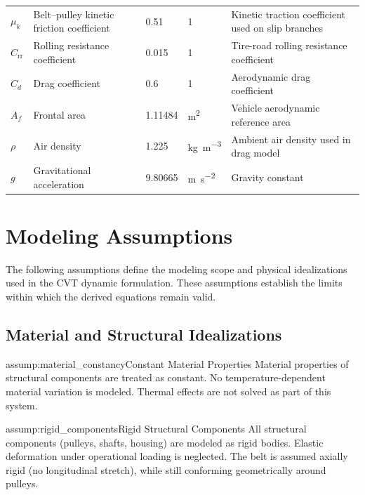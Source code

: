 \documentclass[11pt]{article}
\numberwithin{equation}{section}
\newcounter{assump}
\begin{document}
\begin{center}
\begin{longtable}{@{}p{}p{}p{}p{}p{}@{}}
$\mu_k$ & Belt--pulley kinetic friction coefficient & 0.51 & 1 & Kinetic traction coefficient used on slip branches \\
$C_{\mathrm{rr}}$ & Rolling resistance coefficient & 0.015 & 1 & Tire-road rolling resistance coefficient \\
$C_d$ & Drag coefficient & 0.6 & 1 & Aerodynamic drag coefficient \\
$A_f$ & Frontal area & 1.11484 & \si{\meter\squared} & Vehicle aerodynamic reference area \\
$\rho$ & Air density & 1.225 & \si{\kilogram\per\meter\cubed} & Ambient air density used in drag model \\
$g$ & Gravitational acceleration & 9.80665 & \si{\meter\per\second\squared} & Gravity constant \\
\end{longtable}
\normalsize
\end{center}

\section{Modeling Assumptions}\label{sec:assumptions}

The following assumptions define the modeling scope and physical idealizations
used in the CVT dynamic formulation. These assumptions establish the limits
within which the derived equations remain valid.

\subsection{Material and Structural Idealizations}

\begin{assumptionblock}{assump:material_constancy}{Constant Material Properties}
Material properties of structural components are treated as constant.
No temperature-dependent material variation is modeled.
Thermal effects are not solved as part of this system.
\end{assumptionblock}

\begin{assumptionblock}{assump:rigid_components}{Rigid Structural Components}
All structural components (pulleys, shafts, housing) are modeled as rigid bodies.
Elastic deformation under operational loading is neglected.
The belt is assumed axially rigid (no longitudinal stretch),
while still conforming geometrically around pulleys.
\end{assumptionblock}
\end{document}
